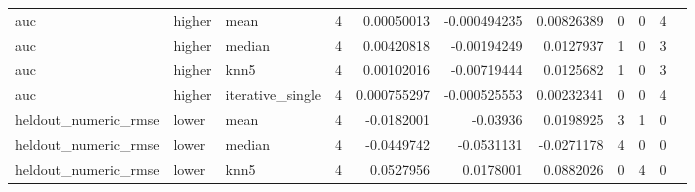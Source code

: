 \begin{table}[ht]
{\begin{tabular}{lllrrrrrrrl}
 auc                            & higher             & mean             &            4 &                            0.00050013  &          -0.000494235 &             0.00826389 &                         0 &                        0 &                                4 &                                                                                                                    \\
 auc                            & higher             & median           &            4 &                            0.00420818  &          -0.00194249  &             0.0127937  &                         1 &                        0 &                                3 &                                                                                                                    \\
 auc                            & higher             & knn5             &            4 &                            0.00102016  &          -0.00719444  &             0.0125682  &                         1 &                        0 &                                3 &                                                                                                                    \\
 auc                            & higher             & iterative\_single &            4 &                            0.000755297 &          -0.000525553 &             0.00232341 &                         0 &                        0 &                                4 &                                                                                                                    \\
 heldout\_numeric\_rmse           & lower              & mean             &            4 &                           -0.0182001   &          -0.03936     &             0.0198925  &                         3 &                        1 &                                0 &                                                                                                                    \\
 heldout\_numeric\_rmse           & lower              & median           &            4 &                           -0.0449742   &          -0.0531131   &            -0.0271178  &                         4 &                        0 &                                0 &                                                                                                                    \\
 heldout\_numeric\_rmse           & lower              & knn5             &            4 &                            0.0527956   &           0.0178001   &             0.0882026  &                         0 &                        4 &                                0 &                                                                                                                    \\

\end{tabular}}
\end{table}
